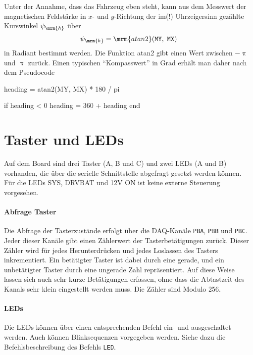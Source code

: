 Unter der Annahme, dass das Fahrzeug eben steht, kann aus dem Messwert der magnetischen Feldstärke in $x$- und $y$-Richtung der im(!) Uhrzeigersinn gezählte Kurswinkel $\psi_\mrm{h}$ über
\begin{align*}
	\psi_\mrm{h} = \mrm{atan2}(\mathtt{MY},\ \mathtt{MX})
\end{align*}
in Radiant bestimmt werden. Die Funktion atan2 gibt einen Wert zwischen $-\uppi$ und $\uppi$ zurück. Einen typischen "`Kompasswert"' in Grad erhält man daher nach dem Pseudocode
\begin{verbatimtab}[4]
	heading = atan2(MY, MX) * 180 / pi
	
	if heading < 0
		heading = 360 + heading
	end
\end{verbatimtab}



\section{Taster und LEDs}

Auf dem Board sind drei Taster (A, B und C) und zwei LEDs (A und B) vorhanden, die über die serielle Schnittstelle abgefragt \bzw gesetzt werden können. Für die LEDs SYS, DRVBAT und 12V ON ist keine externe Steuerung vorgesehen.


\paragraph{Abfrage Taster}

Die Abfrage der Tasterzustände erfolgt über die DAQ-Kanäle \verb|PBA|, \verb|PBB| und \verb|PBC|. Jeder dieser Kanäle gibt einen Zählerwert der Tasterbetätigungen zurück. Dieser Zähler wird für jedes Herunterdrücken und jedes Loslassen des Tasters inkrementiert. Ein betätigter Taster ist dabei durch eine gerade, und ein unbetätigter Taster durch eine ungerade Zahl repräsentiert. Auf diese Weise lassen sich auch sehr kurze Betätigungen erfassen, ohne dass die Abtastzeit des Kanals sehr klein eingestellt werden muss. Die Zähler sind Modulo 256.

\paragraph{LEDs}

Die LEDs können über einen entsprechenden Befehl ein- und ausgeschaltet werden. Auch können Blinksequenzen vorgegeben werden. Siehe dazu die Befehlsbeschreibung des Befehls \verb|LED|.

